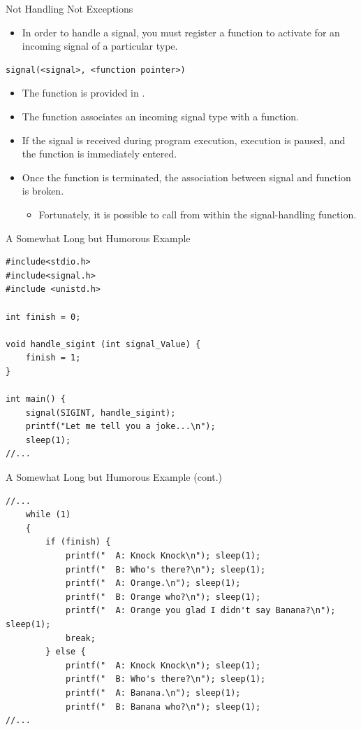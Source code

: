 \documentclass[11pt]{beamer}
\let\OldTexttt\texttt
\renewcommand{\texttt}[1]{\OldTexttt{\color{teal}{#1}}}
\begin{document}
\begin{frame}[fragile=singleslide]{Not Handling Not Exceptions}
\begin{itemize}
\item In order to handle a signal, you must register a function to activate for an incoming signal of a particular type.
\end{itemize}
\begin{lstlisting}[style=C]
signal(<signal>, <function pointer>)
\end{lstlisting}
\begin{itemize}
\item The \texttt{signal()} function is provided in \texttt{<signal.h>}.
\item The function associates an incoming signal type with a function. 
\item  If the signal is received during program execution, execution is paused, and the function is immediately entered.  
\item Once the function is terminated, the association between signal and function is broken.
\begin{itemize}
\item Fortunately, it is possible to call \texttt{signal()} from within the signal-handling function.  
\end{itemize}
\end{itemize}
\end{frame}

\begin{frame}[fragile=singleslide]{A Somewhat Long but Humorous Example}
\begin{lstlisting}[style=C]
#include<stdio.h>
#include<signal.h>
#include <unistd.h>

int finish = 0;

void handle_sigint (int signal_Value) {
	finish = 1;
}

int main() {
	signal(SIGINT, handle_sigint); 
	printf("Let me tell you a joke...\n");
    sleep(1); 
//...
\end{lstlisting}    
\end{frame}

\begin{frame}[fragile=singleslide]{A Somewhat Long but Humorous Example (cont.)}
\begin{lstlisting}[style=C]
//...
    while (1) 
    { 
    	if (finish) {
    		printf("  A: Knock Knock\n"); sleep(1); 
    	    printf("  B: Who's there?\n"); sleep(1);
    	    printf("  A: Orange.\n"); sleep(1);
    	    printf("  B: Orange who?\n"); sleep(1);
	        printf("  A: Orange you glad I didn't say Banana?\n"); sleep(1);
	        break;
    	} else {
    	    printf("  A: Knock Knock\n"); sleep(1); 
    	    printf("  B: Who's there?\n"); sleep(1);
    	    printf("  A: Banana.\n"); sleep(1);
    	    printf("  B: Banana who?\n"); sleep(1);
//...
\end{lstlisting}    
\end{frame}
\end{document}
